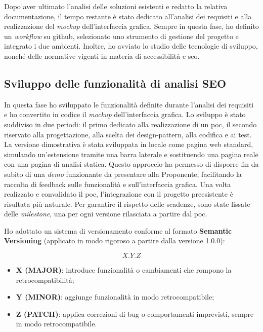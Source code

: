 \vspace{5pt}
\par\noindent Dopo aver ultimato l’analisi delle soluzioni esistenti e redatto la relativa documentazione, il tempo restante è stato dedicato all’analisi dei \gls{requisiti} e alla realizzazione del \textit{mockup} dell’interfaccia grafica. Sempre in questa fase, ho definito un \textit{workflow} su \gls{github}, selezionato uno strumento di gestione del progetto e integrato i due ambienti. Inoltre, ho avviato lo studio delle tecnologie di sviluppo, nonché delle normative vigenti in materia di accessibilità e \gls{seo}.

\subsection{Sviluppo delle funzionalità di analisi SEO}

\par In questa fase ho sviluppato le funzionalità definite durante l’analisi dei \gls{requisiti} e ho convertito in codice il \textit{mockup} dell’interfaccia grafica. Lo sviluppo è stato suddiviso in due periodi: il primo dedicato alla realizzazione di un \gls{poc}, il secondo riservato alla progettazione, alla scelta dei \gls{design-pattern}, alla codifica e ai test. La versione dimostrativa è stata sviluppata in locale come pagina web standard, simulando un’estensione tramite una barra laterale e sostituendo una pagina reale con una pagina di analisi statica. Questo approccio ha permesso di disporre fin da subito di una \textit{demo} funzionante da presentare alla Proponente, facilitando la raccolta di feedback sulle funzionalità e sull’interfaccia grafica. Una volta realizzato e convalidato il \gls{poc}, l’integrazione con il progetto preesistente è risultata più naturale. Per garantire il rispetto delle scadenze, sono state fissate delle \textit{milestone}, una per ogni versione rilasciata a partire dal \gls{poc}.

\vspace{10pt}
\par\noindent Ho adottato un sistema di versionamento conforme al formato \textbf{Semantic Versioning} (applicato in modo rigoroso a partire dalla versione 1.0.0):

\[
X.Y.Z
\]

\begin{itemize}
  \item \textbf{X (MAJOR)}: introduce funzionalità o cambiamenti che rompono  la retrocompatibilità;
  \item \textbf{Y (MINOR)}: aggiunge funzionalità in modo retrocompatibile;
  \item \textbf{Z (PATCH)}: applica correzioni di bug o comportamenti imprevisti, sempre in modo retrocompatibile.
\end{itemize}


